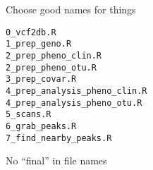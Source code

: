 \documentclass[aspectratio=169,12pt,t]{beamer}
\begin{document}
\begin{frame}[fragile,c]{Choose good names for things}

\begin{center}
\begin{minipage}[c]{10.3cm}
\begin{semiverbatim}
\lstset{basicstyle=\normalsize}
\begin{lstlisting}[linewidth=10.3cm]
0_vcf2db.R
1_prep_geno.R
2_prep_pheno_clin.R
2_prep_pheno_otu.R
3_prep_covar.R
4_prep_analysis_pheno_clin.R
4_prep_analysis_pheno_otu.R
5_scans.R
6_grab_peaks.R
7_find_nearby_peaks.R
\end{lstlisting}
\end{semiverbatim}
\end{minipage}
\end{center}


\end{frame}



\begin{frame}[c]{No ``{\hilit final}'' in file names}

\vspace*{3mm}

\centering



\end{frame}
\end{document}
